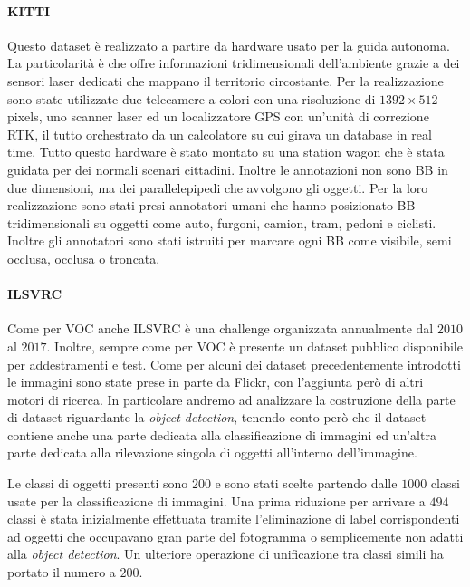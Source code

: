 \paragraph{KITTI}  \cite{geiger2012we} Questo dataset è realizzato a partire da hardware usato per la guida autonoma. La particolarità è che offre informazioni tridimensionali dell'ambiente grazie a dei sensori laser dedicati che mappano il territorio circostante. Per la realizzazione sono state  utilizzate due telecamere a colori con una risoluzione di $1392 \times 512$ pixels, uno scanner laser ed un localizzatore GPS con un'unità di correzione RTK, il tutto orchestrato da un calcolatore su cui girava un database in real time.  Tutto questo hardware è stato montato su una station wagon che è stata guidata per dei normali scenari cittadini. 
Inoltre le annotazioni non sono \ac{BB} in due dimensioni, ma dei parallelepipedi che avvolgono gli oggetti. Per la loro realizzazione sono stati presi annotatori umani che hanno posizionato \ac{BB} tridimensionali su oggetti come auto, furgoni, camion, tram, pedoni e ciclisti. Inoltre gli annotatori sono stati istruiti per marcare ogni \ac{BB} come visibile, semi occlusa, occlusa o troncata. 



\paragraph{ILSVRC}
Come per \ac{VOC} anche \ac{ILSVRC} \cite{russakovsky2015imagenet} è una challenge organizzata annualmente dal $2010$ al $2017$. Inoltre, sempre come per \ac{VOC} è presente un dataset pubblico disponibile per addestramenti e test. 
Come per alcuni dei dataset precedentemente introdotti le immagini sono state prese in parte da Flickr, con l'aggiunta però di altri motori di ricerca. In particolare andremo ad analizzare la costruzione della parte di dataset riguardante la \textit{object detection}, tenendo conto però che il dataset contiene anche una parte dedicata alla classificazione di immagini ed un'altra parte dedicata alla rilevazione singola di oggetti all'interno dell'immagine. 

Le classi di oggetti presenti sono $200$ e sono stati scelte partendo dalle $1000$ classi usate per la classificazione di immagini. Una prima riduzione per arrivare a $494$ classi è stata inizialmente effettuata tramite l'eliminazione di label corrispondenti ad oggetti che occupavano gran parte del fotogramma o semplicemente non adatti alla \textit{object detection}. Un ulteriore operazione di unificazione tra classi simili ha portato il numero a $200$. 

